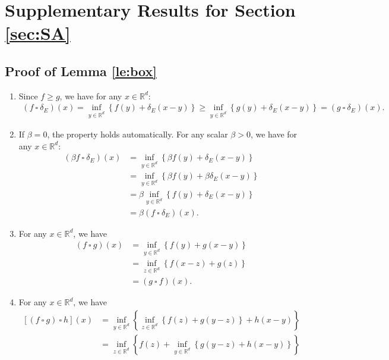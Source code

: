 \documentclass[11 pt]{article}
\begin{document}
	\section{Supplementary Results for Section \ref{sec:SA}}
	\subsection{Proof of Lemma \ref{le:box}} \label{pf:le:box}
	\label{proof: properties of infimal convolution with an indicator function}
	\begin{enumerate}[(1)]
		\item Since $f \geq g$, we have for any $x\in\mathbb{R}^d:$
		\begin{align*}
			(f ~\square~ \delta_E)(x) =\inf_{y \in\mathbb{R}^d}\left\{f(y)+\delta_E(x-y)\right\} \geq  \inf_{y \in\mathbb{R}^d}\left\{g(y)+\delta_E(x-y)\right\} =(g ~\square~ \delta_E)(x).
		\end{align*}
		\item If $\beta = 0$, the property holds automatically. For any scalar $\beta > 0$, we have for any $x\in\mathbb{R}^d$:
		\begin{align*}
			(\beta f ~\square~ \delta_E)(x) &=\inf_{y \in\mathbb{R}^d}\left\{\beta f(y)+\delta_E(x-y)\right\}\\
			&=\inf_{y \in\mathbb{R}^d}\left\{\beta f(y)+\beta \delta_E(x-y)\right\}\tag{$\delta_E = \beta \delta_E$}\\
			&=\beta \inf_{y \in\mathbb{R}^d}\left\{ f(y)+ \delta_E(x-y)\right\}\\
			&=\beta(f ~\square~ \delta_E)(x).
		\end{align*}
		\item For any $x \in \mathbb{R}^d$, we have
		\begin{align*}
			(f ~\square~ g)(x)&=\inf_{y \in\mathbb{R}^d}\left\{f(y)+g(x-y)\right\}\\
			&=\inf_{z \in\mathbb{R}^d}\left\{f(x-z)+g(z)\right\}\tag{Change of variable: $z=x-y$}\\
			&=(g ~\square~ f)(x).
		\end{align*}
		\item For any $x\in\mathbb{R}^d$, we have 
		\begin{align*}
			\left[(f ~\square~ g) ~\square~ h\right](x) &=\inf_{y\in\mathbb{R}^d}\left\{\inf_{z \in\mathbb{R}^d}\left\{f(z)+g(y-z)\right\}+h(x-y)\right\}\\
			&=\inf_{z\in\mathbb{R}^d}\left\{f(z) + \inf_{y \in\mathbb{R}^d}\left\{g(y-z)+h(x-y)\right\}\right\}\\

\end{align*}
\end{enumerate}
\end{document}
